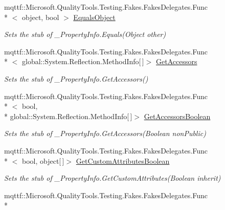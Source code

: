 \begin{DoxyCompactItemize}
mqttf\-::\-Microsoft.\-Quality\-Tools.\-Testing.\-Fakes.\-Fakes\-Delegates.\-Func\\*
$<$ object, bool $>$ \hyperlink{class_system_1_1_runtime_1_1_interop_services_1_1_fakes_1_1_stub___property_info_a930478152737dbf83d678f9811b6ddb5}{Equals\-Object}
\begin{DoxyCompactList}\small\item\em Sets the stub of \-\_\-\-Property\-Info.\-Equals(\-Object other)\end{DoxyCompactList}\item 
mqttf\-::\-Microsoft.\-Quality\-Tools.\-Testing.\-Fakes.\-Fakes\-Delegates.\-Func\\*
$<$ global\-::\-System.\-Reflection.\-Method\-Info\mbox{[}$\,$\mbox{]}$>$ \hyperlink{class_system_1_1_runtime_1_1_interop_services_1_1_fakes_1_1_stub___property_info_a6f164b7716e580a61c0c538652eeddc1}{Get\-Accessors}
\begin{DoxyCompactList}\small\item\em Sets the stub of \-\_\-\-Property\-Info.\-Get\-Accessors()\end{DoxyCompactList}\item 
mqttf\-::\-Microsoft.\-Quality\-Tools.\-Testing.\-Fakes.\-Fakes\-Delegates.\-Func\\*
$<$ bool, \\*
global\-::\-System.\-Reflection.\-Method\-Info\mbox{[}$\,$\mbox{]}$>$ \hyperlink{class_system_1_1_runtime_1_1_interop_services_1_1_fakes_1_1_stub___property_info_abbe3d0fbe2ea7122bd4e9906ff468fd9}{Get\-Accessors\-Boolean}
\begin{DoxyCompactList}\small\item\em Sets the stub of \-\_\-\-Property\-Info.\-Get\-Accessors(\-Boolean non\-Public)\end{DoxyCompactList}\item 
mqttf\-::\-Microsoft.\-Quality\-Tools.\-Testing.\-Fakes.\-Fakes\-Delegates.\-Func\\*
$<$ bool, object\mbox{[}$\,$\mbox{]}$>$ \hyperlink{class_system_1_1_runtime_1_1_interop_services_1_1_fakes_1_1_stub___property_info_a95ec0edbc679ada0eda1f7488060259f}{Get\-Custom\-Attributes\-Boolean}
\begin{DoxyCompactList}\small\item\em Sets the stub of \-\_\-\-Property\-Info.\-Get\-Custom\-Attributes(\-Boolean inherit)\end{DoxyCompactList}\item 
mqttf\-::\-Microsoft.\-Quality\-Tools.\-Testing.\-Fakes.\-Fakes\-Delegates.\-Func\\*

\end{DoxyCompactItemize}
